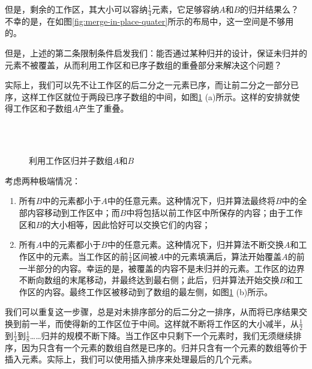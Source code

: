 \documentclass[UTF8]{article}
\begin{document}
但是，剩余的工作区，其大小可以容纳$\frac{1}{4}$元素，它足够容纳$A$和$B$的归并结果么？不幸的是，在如图\ref{fig:merge-in-place-quater}所示的布局中，这一空间是不够用的。

但是，上述的第二条限制条件启发我们：能否通过某种归并的设计，保证未归并的元素不被覆盖，从而利用工作区和已序子数组的重叠部分来解决这个问题？

实际上，我们可以先不让工作区的后二分之一元素已序，而让前二分之一部分已序，这样工作区就位于两段已序子数组的中间，如图\ref{fig:merge-in-place-setup} (a)所示。这样的安排就使得工作区和子数组$A$产生了重叠\cite{msort-in-place}。

\begin{figure}[htbp]
 \centering
  \\
  \\
 \caption{利用工作区归并子数组$A$和$B$}
 \label{fig:merge-in-place-setup}
\end{figure}

考虑两种极端情况：

\begin{enumerate}
\item 所有$B$中的元素都小于$A$中的任意元素。这种情况下，归并算法最终将$B$中的全部内容移动到工作区中；而$B$中将包括以前工作区中所保存的内容；由于工作区和$B$的大小相等，因此恰好可以交换它们的内容；
\item 所有$A$中的元素都小于$B$中的任意元素。这种情况下，归并算法不断交换$A$和工作区中的元素。当工作区的前$\frac{1}{4}$区间被$A$中的元素填满后，算法开始覆盖$A$的前一半部分的内容。幸运的是，被覆盖的内容不是未归并的元素。工作区的边界不断向数组的末尾移动，并最终达到最右侧；此后，归并算法开始交换$B$和工作区的内容。最终工作区被移动到了数组的最左侧，如图\ref{fig:merge-in-place-setup} (b)所示。
\end{enumerate}

我们可以重复这一步骤，总是对未排序部分的后二分之一排序，从而将已序结果交换到前一半，而使得新的工作区位于中间。这样就不断将工作区的大小减半，从$\frac{1}{2}$到$\frac{1}{4}$到$\frac{1}{8}$……归并的规模不断下降。当工作区中只剩下一个元素时，我们无须继续排序，因为只含有一个元素的数组自然是已序的。归并只含有一个元素的数组等价于插入元素。实际上，我们可以使用插入排序来处理最后的几个元素。
\end{document}
